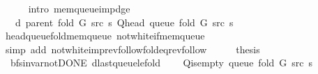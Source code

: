 \begin{isabellebody}
\ \ \ \ \isamarkupfalse%
\ {\isacharparenleft}{\kern0pt}intro\ mem{\isacharunderscore}{\kern0pt}queue{\isacharunderscore}{\kern0pt}imp{\isacharunderscore}{\kern0pt}d{\isacharunderscore}{\kern0pt}ge{\isacharparenright}{\kern0pt}\isanewline
\ \ \isamarkupfalse%
\ \isamarkupfalse%
\ {\isachardoublequoteopen}{\isachardot}{\kern0pt}{\isachardot}{\kern0pt}{\isachardot}{\kern0pt}\ {\isacharequal}{\kern0pt}\ d\ {\isacharparenleft}{\kern0pt}parent\ {\isacharparenleft}{\kern0pt}fold\ G\ src\ s{\isacharparenright}{\kern0pt}{\isacharparenright}{\kern0pt}\ {\isacharparenleft}{\kern0pt}Q{\isacharunderscore}{\kern0pt}head\ {\isacharparenleft}{\kern0pt}queue\ {\isacharparenleft}{\kern0pt}fold\ G\ src\ s{\isacharparenright}{\kern0pt}{\isacharparenright}{\kern0pt}{\isacharparenright}{\kern0pt}{\isachardoublequoteclose}\isanewline
\ \ \ \ \isamarkupfalse%
\ head{\isacharunderscore}{\kern0pt}queue{\isacharunderscore}{\kern0pt}fold{\isacharunderscore}{\kern0pt}mem{\isacharunderscore}{\kern0pt}queue\ not{\isacharunderscore}{\kern0pt}white{\isacharunderscore}{\kern0pt}if{\isacharunderscore}{\kern0pt}mem{\isacharunderscore}{\kern0pt}queue\isanewline
\ \ \ \ \isamarkupfalse%
\ {\isacharparenleft}{\kern0pt}simp\ add{\isacharcolon}{\kern0pt}\ not{\isacharunderscore}{\kern0pt}white{\isacharunderscore}{\kern0pt}imp{\isacharunderscore}{\kern0pt}rev{\isacharunderscore}{\kern0pt}follow{\isacharunderscore}{\kern0pt}fold{\isacharunderscore}{\kern0pt}eq{\isacharunderscore}{\kern0pt}rev{\isacharunderscore}{\kern0pt}follow{\isacharparenright}{\kern0pt}\isanewline
\ \ \isamarkupfalse%
\ \isamarkupfalse%
\ {\isacharquery}{\kern0pt}thesis\isanewline
\ \ \ \ \isacommand{{\isachardot}{\kern0pt}}\isamarkupfalse%
\isanewline
{}\isamarkupfalse%
%
\endisatagproof
{\isafoldproof}%
%
\isadelimproof
\isanewline
%
\endisadelimproof
\isanewline
{}\isamarkupfalse%
\ {\isacharparenleft}{\kern0pt}\ bfs{\isacharunderscore}{\kern0pt}invar{\isacharunderscore}{\kern0pt}not{\isacharunderscore}{\kern0pt}DONE{\isacharparenright}{\kern0pt}\ d{\isacharunderscore}{\kern0pt}last{\isacharunderscore}{\kern0pt}queue{\isacharunderscore}{\kern0pt}le{\isacharunderscore}{\kern0pt}fold{\isacharcolon}{\kern0pt}\isanewline
\ \ \ {\isachardoublequoteopen}{\isasymnot}\ Q{\isacharunderscore}{\kern0pt}is{\isacharunderscore}{\kern0pt}empty\ {\isacharparenleft}{\kern0pt}queue\ {\isacharparenleft}{\kern0pt}fold\ G\ src\ s{\isacharparenright}{\kern0pt}{\isacharparenright}{\kern0pt}{\isachardoublequoteclose}\isanewline

\end{isabellebody}

